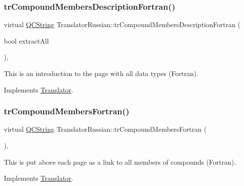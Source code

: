 \subsubsection{\texorpdfstring{trCompoundMembersDescriptionFortran()}{trCompoundMembersDescriptionFortran()}}
{\footnotesize\ttfamily virtual \mbox{\hyperlink{class_q_c_string}{Q\+C\+String}} Translator\+Russian\+::tr\+Compound\+Members\+Description\+Fortran (\begin{DoxyParamCaption}\item[{bool}]{extract\+All }\end{DoxyParamCaption})\hspace{0.3cm}{\ttfamily [inline]}, {\ttfamily [virtual]}}

This is an introduction to the page with all data types (Fortran). 

Implements \mbox{\hyperlink{class_translator}{Translator}}.

\mbox{\label{class_translator_russian_aa6d2c00b924b6b9f0a3f6f7b60466179}} 
\subsubsection{\texorpdfstring{trCompoundMembersFortran()}{trCompoundMembersFortran()}}
{\footnotesize\ttfamily virtual \mbox{\hyperlink{class_q_c_string}{Q\+C\+String}} Translator\+Russian\+::tr\+Compound\+Members\+Fortran (\begin{DoxyParamCaption}{ }\end{DoxyParamCaption})\hspace{0.3cm}{\ttfamily [inline]}, {\ttfamily [virtual]}}

This is put above each page as a link to all members of compounds (Fortran). 

Implements \mbox{\hyperlink{class_translator}{Translator}}.

\mbox{\label{class_translator_russian_a2d0db7cade2c1ae1d3ff933a7e533c63}} 
